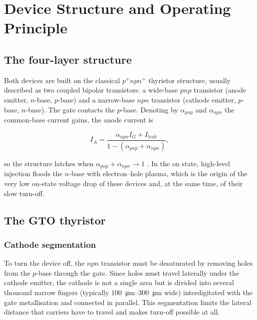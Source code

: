 \section{Device Structure and Operating Principle}
\label{gtoigct:ch:devices}

\subsection{The four-layer structure}

Both devices are built on the classical $p^{+}npn^{+}$ thyristor structure,
usually described as two coupled bipolar transistors: a wide-base $pnp$
transistor (anode emitter, $n$-base, $p$-base) and a narrow-base $npn$
transistor (cathode emitter, $p$-base, $n$-base). The gate contacts the $p$-base.
Denoting by $\alpha_{pnp}$ and $\alpha_{npn}$ the common-base current gains, the
anode current is

\begin{equation}
I_{A} = \frac{\alpha_{npn} I_{G} + I_{leak}}{1 - (\alpha_{pnp} + \alpha_{npn})},
\end{equation}

so the structure latches when $\alpha_{pnp} + \alpha_{npn} \rightarrow 1$
\cite{baliga2008,lutz2011}. In the on state, high-level injection floods the
$n$-base with electron--hole plasma, which is the origin of the very low on-state
voltage drop of these devices and, at the same time, of their slow turn-off.

\subsection{The GTO thyristor}

\subsubsection{Cathode segmentation}

To turn the device off, the $npn$ transistor must be desaturated by removing
holes from the $p$-base through the gate. Since holes must travel laterally
under the cathode emitter, the cathode is not a single area but is divided into
several thousand narrow fingers (typically \SIrange{100}{300}{\micro\metre}
wide) interdigitated with the gate metallisation and connected in parallel. This
segmentation limits the lateral distance that carriers have to travel and makes
turn-off possible at all.

